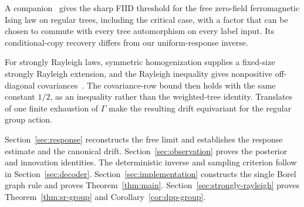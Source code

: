 A companion~\cite[Theorem~1.1]{SharpFreeIsing2026} gives the sharp FIID
threshold for the free zero-field ferromagnetic Ising law on regular
trees, including the critical case, with a factor that can be chosen to commute
with every tree automorphism on every label input. Its conditional-copy recovery
differs from our uniform-response inverse.

For strongly Rayleigh laws, symmetric homogenization supplies a fixed-size
strongly Rayleigh extension, and the Rayleigh inequality gives nonpositive
off-diagonal covariances~\cite[Definition~2.12 and Theorems~4.1--4.2]{BorceaBrandenLiggett2009}.
The covariance-row bound then holds with the same constant $1/2$, as an
inequality rather than the weighted-tree identity. Translates of one finite
exhaustion of $\Gamma$ make the resulting drift equivariant for the regular
group action.

Section~\ref{sec:response} reconstructs the free limit and establishes the
response estimate and the canonical
drift. Section~\ref{sec:observation} proves the posterior and innovation
identities. The deterministic inverse and sampling criterion follow in
Section~\ref{sec:decoder}. Section~\ref{sec:implementation} constructs the
single Borel graph rule and proves Theorem~\ref{thm:main}.
Section~\ref{sec:strongly-rayleigh} proves Theorem~\ref{thm:sr-group} and
Corollary~\ref{cor:dpp-group}.
